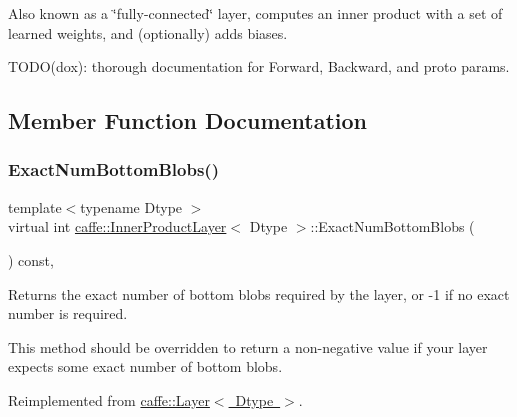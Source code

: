 Also known as a \char`\"{}fully-\/connected\char`\"{} layer, computes an inner product with a set of learned weights, and (optionally) adds biases. 

T\+O\+D\+O(dox)\+: thorough documentation for Forward, Backward, and proto params. 

\subsection{Member Function Documentation}
\mbox{\label{classcaffe_1_1_inner_product_layer_a5afdeb6b448b2f7d0637afa554381500}} 
\subsubsection{\texorpdfstring{Exact\+Num\+Bottom\+Blobs()}{ExactNumBottomBlobs()}\hspace{0.1cm}{\footnotesize\ttfamily [1/2]}}
{\footnotesize\ttfamily template$<$typename Dtype $>$ \\
virtual int \mbox{\hyperlink{classcaffe_1_1_inner_product_layer}{caffe\+::\+Inner\+Product\+Layer}}$<$ Dtype $>$\+::Exact\+Num\+Bottom\+Blobs (\begin{DoxyParamCaption}{ }\end{DoxyParamCaption}) const\hspace{0.3cm}{\ttfamily [inline]}, {\ttfamily [virtual]}}



Returns the exact number of bottom blobs required by the layer, or -\/1 if no exact number is required. 

This method should be overridden to return a non-\/negative value if your layer expects some exact number of bottom blobs. 

Reimplemented from \mbox{\hyperlink{classcaffe_1_1_layer_a8e5ee0494d85f5f55fc4396537cbc60f}{caffe\+::\+Layer$<$ Dtype $>$}}.

\mbox{\label{classcaffe_1_1_inner_product_layer_a5afdeb6b448b2f7d0637afa554381500}} 

